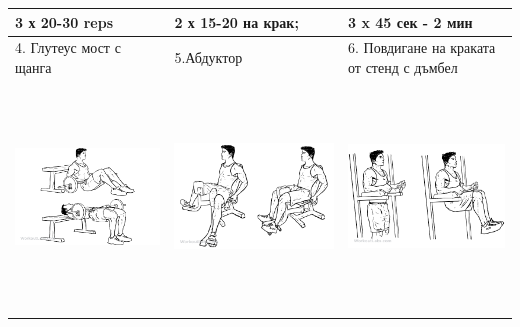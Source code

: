 \documentclass{article}
\begin{document}
\begin{tabular}{ | m{5cm} | m{5cm} | m{5cm} | }
3 х 20-30 reps & 2 х 15-20 на крак; & 3 x 45 сек - 2 мин \\
\hline
4. Глутеус мост с щанга & 5.Абдуктор & 6. Повдигане на краката от стенд с дъмбел \\ 
\begin{minipage}{5cm} \includegraphics[width=\linewidth, height=60mm]{Barbell_Hip_Thrusts.png} \end{minipage} & 
\begin{minipage}{5cm} \includegraphics[width=\linewidth, height=60mm]{Adductor.png} \end{minipage} &
\begin{minipage}{5cm} \includegraphics[width=\linewidth, height=60mm]{Knee_Hip_Raise.png} \end{minipage} \\ 

\end{tabular}
\end{document}
